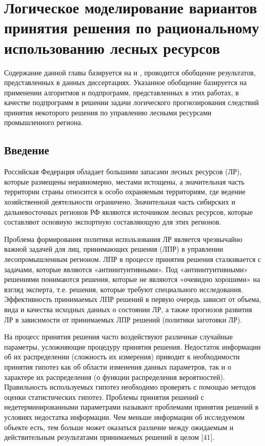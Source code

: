 \chapter{Логическое моделирование вариантов принятия решения по рациональному использованию лесных ресурсов}

\def\textsubscript#1{{\tiny{}#1}}

Содержание данной главы базируется на \cite{dissche} и \cite{dissAsya}, проводится обобщение результатов, представленных в данных диссертациях. Указанное обобщение базируется на применении алгоритмов и подпрограмм, представленных в этих работах, в качестве подпрограмм в решении задачи логического прогнозирования следствий принятия некоторого решения по управлению лесными ресурсами промышленного региона.


\section*{Введение}
Российская Федерация обладает большими запасами лесных ресурсов (ЛР), которые размещены неравномерно, местами истощены, а значительная часть территории страны относится к особо охраняемым территориям, где ведение хозяйственной деятельности ограничено. Значительная часть сибирских и дальневосточных регионов РФ  являются источником лесных ресурсов, которые составляют основную экспортную составляющую для этих регионов.

Проблема формирования политики использования ЛР является чрезвычайно важной задачей для лиц, принимающих решения (ЛПР) в управлении лесопромышленным регионом. ЛПР  в процессе принятия решения сталкивается с задачами, которые являются «антиинтуитивными». Под «антиинтуитивными» решениями понимаются решения, которые не являются «очевидно хорошими» на взгляд эксперта, т.е. решения, которые требуют специального исследования. Эффективность принимаемых ЛПР решений в первую очередь зависит от объема, вида и качества исходных данных о состоянии ЛР, а также прогнозов развития ЛР в зависимости от принимаемых ЛПР решений (политики заготовки ЛР).

На процесс принятия решения часто воздействуют различные случайные параметры, усложняющие процедуру принятия решения. Недостаток информации об их распределении (сложность их измерения) приводит к необходимости принятия гипотез как об области  изменения данных параметров, так и о характере их распределения (о функции распределения вероятностей). Правильность используемых гипотез необходимо проверять с помощью методов оценки статистических гипотез. Проблемы принятия решений с недетерминированными параметрами называют проблемами принятия решений в условиях недостатка информации. Чем меньше информации об исследуемом объекте есть, тем больше может оказаться различие между ожидаемым и действительным результатами принимаемых решений в целом [41].

